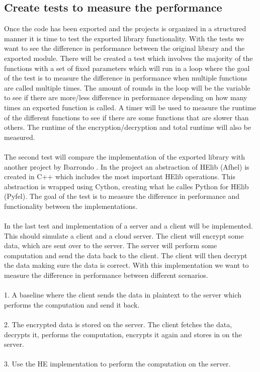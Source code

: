 \newpage

\subsection{Create tests to measure the performance}
Once the code has been exported and the projects is organized in a structured manner it is time to test the exported library functionality. With the tests we want to see the difference in performance between the original library and the exported module. There will be created a test which involves the majority of the functions with a set of fixed parameters which will run in a loop where the goal of the test is to measure the difference in performance when multiple functions are called multiple times. The amount of rounds in the loop will be the variable to see if there are more/less difference in performance depending on how many times an exported function is called. A timer will be used to measure the runtime of the different functions to see if there are some functions that are slower than others. The runtime of the encryption/decryption and total runtime will also be measured.\\\\
The second test will compare the implementation of the exported library with another project by Ibarrondo \cite{Pyfhelhelib}. In the project an abstraction of HElib (Afhel) is created in C++ which includes the most important HElib operations. This abstraction is wrapped using Cython, creating what he calles Python for HElib (Pyfel). The goal of the test is to measure the difference in performance and functionality between the implementations.\\\\
In the last test and implementation of a server and a client will be implemented. This should simulate a client and a cloud server. The client will encrypt some data, which are sent over to the server. The server will perform some computation and send the data back to the client. The client will then decrypt the data making sure the data is correct. With this implementation we want to measure the difference in performance between different scenarios.\\\\
1. A baseline where the client sends the data in plaintext to the server which performs the computation and send it back.\\\\
2. The encrypted data is stored on the server. The client fetches the data, decrypts it, performs the computation, encrypts it again and stores in on the server.\\\\
3. Use the HE implementation to perform the computation on the server.
